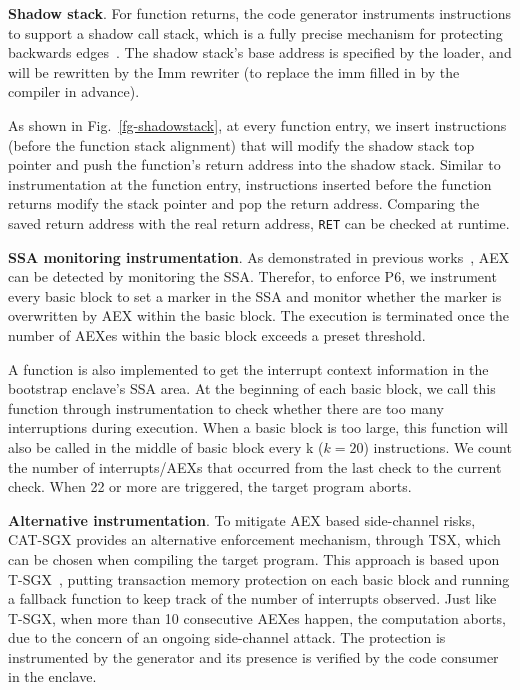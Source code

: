 

\vspace{3pt}\noindent\textbf{Shadow stack}. For function returns, the code generator instruments instructions to support a shadow call stack, which is a fully precise mechanism for protecting backwards edges~\cite{burow2019sok}. The shadow stack’s base address is specified by the loader, and will be rewritten by the Imm rewriter (to replace the imm filled in by the compiler in advance).

As shown in Fig.~\ref{fg-shadowstack}, at every function entry, we insert instructions (before the function stack alignment) that will modify the shadow stack top pointer and push the function's return address into the shadow stack. Similar to instrumentation at the function entry, instructions inserted before the function returns  modify the stack pointer and pop the return address. Comparing the saved return address with the real return address, \texttt{RET} can be checked at runtime.



\vspace{3pt}\noindent\textbf{SSA monitoring instrumentation}. 
As demonstrated in previous works~\cite{gruss2017strong,chen2018racing}, AEX can be detected by monitoring the SSA. Therefor, to enforce P6, we instrument every basic block to set a marker in the SSA and monitor whether the marker is overwritten by AEX within the basic block. The execution is terminated once the number of AEXes within the basic block exceeds a preset threshold. 

A function is also implemented to get the interrupt context information in the bootstrap enclave's SSA area. At the beginning of each basic block, we call this function through instrumentation to check whether there are too many interruptions during execution. When a basic block is too large, this function will also be called in the middle of basic block every k ($k=20$) instructions. We count the number of interrupts/AEXs that occurred from the last check to the current check. When 22 or more are triggered, the target program aborts.

\vspace{3pt}\noindent\textbf{Alternative instrumentation}. 
To mitigate AEX based side-channel risks, CAT-SGX provides an alternative enforcement mechanism, through TSX, which can be chosen when compiling the target program. This approach is based upon T-SGX~\cite{shih2017t}, putting transaction memory protection on each basic block and running a fallback function to keep track of the number of interrupts observed. Just like T-SGX, when more than 10 consecutive AEXes happen, the computation aborts, due to the concern of an ongoing side-channel attack.  The protection is instrumented by the generator and its presence is verified by the code consumer in the enclave. 


